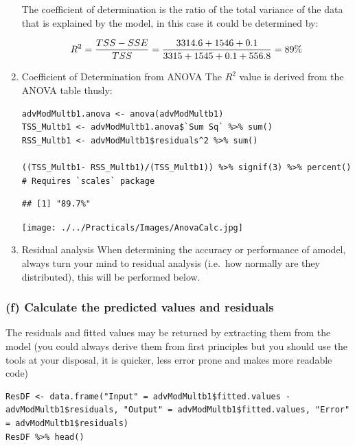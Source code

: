 \documentclass[11pt]{article}
\begin{document}
\begin{enumerate}
The coefficient of determination is the ratio of the total variance of
the data that is explained by the model, in this case it could be
determined by:

$$
  R^2 = \frac{TSS-SSE}{TSS} = \frac{3314.6+1546+0.1}{3315+1545+0.1+556.8} = 89\%
  \ \\
  $$

\item Coefficient of Determination from ANOVA
\label{sec:orge5ea163}
The \(R^2\) value is derived from the ANOVA table thusly:

\begin{verbatim}
advModMultb1.anova <- anova(advModMultb1)
TSS_Multb1 <- advModMultb1.anova$`Sum Sq` %>% sum()
RSS_Multb1 <- advModMultb1$residuals^2 %>% sum()

((TSS_Multb1- RSS_Multb1)/(TSS_Multb1)) %>% signif(3) %>% percent()   # Requires `scales` package
\end{verbatim}

\begin{verbatim}
## [1] "89.7%"
\end{verbatim}

\begin{center}
\texttt{[image: ./../Practicals/Images/AnovaCalc.jpg]}
\end{center}

\item Residual analysis
\label{sec:org92d1a40}
When determining the accuracy or performance of amodel, always turn your
mind to residual analysis (i.e. how normally are they distributed), this
will be performed below.
\end{enumerate}

\subsubsection{(f) Calculate the predicted values and residuals}
\label{sec:org4bec9a1}
The residuals and fitted values may be returned by extracting them from
the model (you could always derive them from first principles but you
should use the tools at your disposal, it is quicker, less error prone
and makes more readable code)

\begin{verbatim}
ResDF <- data.frame("Input" = advModMultb1$fitted.values - advModMultb1$residuals, "Output" = advModMultb1$fitted.values, "Error" = advModMultb1$residuals) 
ResDF %>% head()
\end{verbatim}
\end{document}
